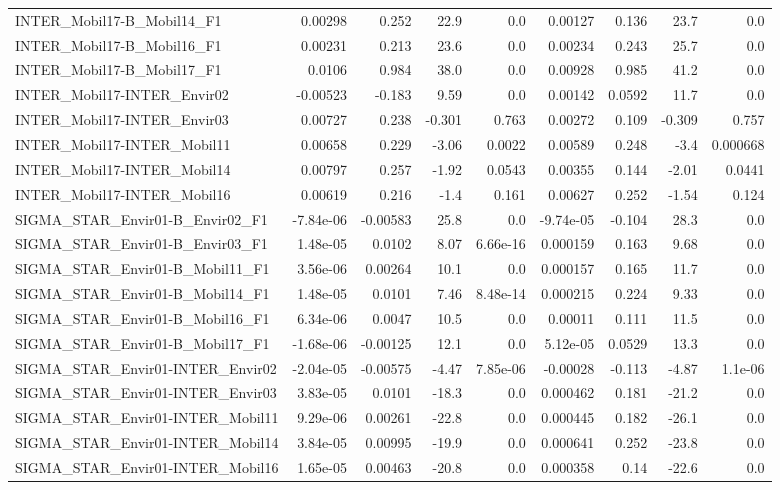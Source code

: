 \begin{tabular}{lrrrrrrrr}
INTER_Mobil17-B_Mobil14_F1 & 0.00298 & 0.252 & 22.9 & 0.0 & 0.00127 & 0.136 & 23.7 & 0.0 \\
INTER_Mobil17-B_Mobil16_F1 & 0.00231 & 0.213 & 23.6 & 0.0 & 0.00234 & 0.243 & 25.7 & 0.0 \\
INTER_Mobil17-B_Mobil17_F1 & 0.0106 & 0.984 & 38.0 & 0.0 & 0.00928 & 0.985 & 41.2 & 0.0 \\
INTER_Mobil17-INTER_Envir02 & -0.00523 & -0.183 & 9.59 & 0.0 & 0.00142 & 0.0592 & 11.7 & 0.0 \\
INTER_Mobil17-INTER_Envir03 & 0.00727 & 0.238 & -0.301 & 0.763 & 0.00272 & 0.109 & -0.309 & 0.757 \\
INTER_Mobil17-INTER_Mobil11 & 0.00658 & 0.229 & -3.06 & 0.0022 & 0.00589 & 0.248 & -3.4 & 0.000668 \\
INTER_Mobil17-INTER_Mobil14 & 0.00797 & 0.257 & -1.92 & 0.0543 & 0.00355 & 0.144 & -2.01 & 0.0441 \\
INTER_Mobil17-INTER_Mobil16 & 0.00619 & 0.216 & -1.4 & 0.161 & 0.00627 & 0.252 & -1.54 & 0.124 \\
SIGMA_STAR_Envir01-B_Envir02_F1 & -7.84e-06 & -0.00583 & 25.8 & 0.0 & -9.74e-05 & -0.104 & 28.3 & 0.0 \\
SIGMA_STAR_Envir01-B_Envir03_F1 & 1.48e-05 & 0.0102 & 8.07 & 6.66e-16 & 0.000159 & 0.163 & 9.68 & 0.0 \\
SIGMA_STAR_Envir01-B_Mobil11_F1 & 3.56e-06 & 0.00264 & 10.1 & 0.0 & 0.000157 & 0.165 & 11.7 & 0.0 \\
SIGMA_STAR_Envir01-B_Mobil14_F1 & 1.48e-05 & 0.0101 & 7.46 & 8.48e-14 & 0.000215 & 0.224 & 9.33 & 0.0 \\
SIGMA_STAR_Envir01-B_Mobil16_F1 & 6.34e-06 & 0.0047 & 10.5 & 0.0 & 0.00011 & 0.111 & 11.5 & 0.0 \\
SIGMA_STAR_Envir01-B_Mobil17_F1 & -1.68e-06 & -0.00125 & 12.1 & 0.0 & 5.12e-05 & 0.0529 & 13.3 & 0.0 \\
SIGMA_STAR_Envir01-INTER_Envir02 & -2.04e-05 & -0.00575 & -4.47 & 7.85e-06 & -0.00028 & -0.113 & -4.87 & 1.1e-06 \\
SIGMA_STAR_Envir01-INTER_Envir03 & 3.83e-05 & 0.0101 & -18.3 & 0.0 & 0.000462 & 0.181 & -21.2 & 0.0 \\
SIGMA_STAR_Envir01-INTER_Mobil11 & 9.29e-06 & 0.00261 & -22.8 & 0.0 & 0.000445 & 0.182 & -26.1 & 0.0 \\
SIGMA_STAR_Envir01-INTER_Mobil14 & 3.84e-05 & 0.00995 & -19.9 & 0.0 & 0.000641 & 0.252 & -23.8 & 0.0 \\
SIGMA_STAR_Envir01-INTER_Mobil16 & 1.65e-05 & 0.00463 & -20.8 & 0.0 & 0.000358 & 0.14 & -22.6 & 0.0 \\

\end{tabular}
